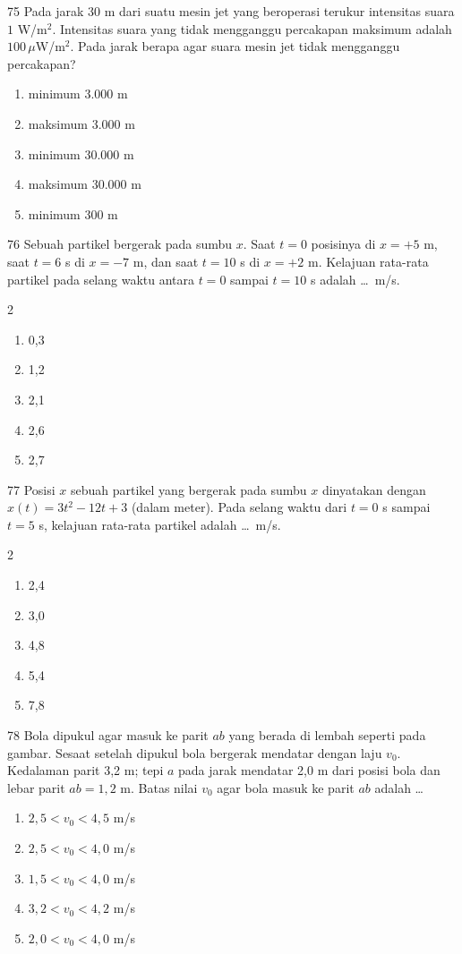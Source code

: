 \documentclass[11pt]{article}
\newenvironment{pil}{%
  \begin{enumerate}[label=(\Alph*),leftmargin=*,itemsep=1pt,topsep=3pt]}%
  {\end{enumerate}}
\newenvironment{pilB}{%
  \par\smallskip\begin{multicols}{2}
  \begin{enumerate}[label=(\Alph*),leftmargin=*,itemsep=1pt,topsep=3pt]}%
  {\end{enumerate}\end{multicols}}
\begin{document}
\begin{soal}{75}
Pada jarak 30 m dari suatu mesin jet yang beroperasi terukur intensitas
suara $1$ W/m$^2$. Intensitas suara yang tidak mengganggu percakapan
maksimum adalah $100\,\mu$W/m$^2$. Pada jarak berapa agar suara mesin
jet tidak mengganggu percakapan?
\begin{pil}
  \item minimum 3.000 m \item maksimum 3.000 m \item minimum 30.000 m
  \item maksimum 30.000 m \item minimum 300 m
\end{pil}
\end{soal}


\begin{soal}{76}
Sebuah partikel bergerak pada sumbu $x$. Saat $t=0$ posisinya di
$x=+5$ m, saat $t=6$ s di $x=-7$ m, dan saat $t=10$ s di $x=+2$ m.
Kelajuan rata-rata partikel pada selang waktu antara $t=0$ sampai
$t=10$ s adalah \ldots\ m/s.
\begin{pilB}
  \item 0,3 \item 1,2 \item 2,1 \item 2,6 \item 2,7
\end{pilB}
\end{soal}

\begin{soal}{77}
Posisi $x$ sebuah partikel yang bergerak pada sumbu $x$ dinyatakan
dengan $x(t)=3t^2-12t+3$ (dalam meter). Pada selang waktu dari $t=0$ s
sampai $t=5$ s, kelajuan rata-rata partikel adalah \ldots\ m/s.
\begin{pilB}
  \item 2,4 \item 3,0 \item 4,8 \item 5,4 \item 7,8
\end{pilB}
\end{soal}

\begin{soal}{78}
Bola dipukul agar masuk ke parit $ab$ yang berada di lembah seperti pada
gambar. Sesaat setelah dipukul bola bergerak mendatar dengan laju $v_0$.
Kedalaman parit 3,2 m; tepi $a$ pada jarak mendatar 2,0 m dari posisi
bola dan lebar parit $ab=1{,}2$ m. Batas nilai $v_0$ agar bola masuk
ke parit $ab$ adalah \ldots
\begin{pil}
  \item $2{,}5<v_0<4{,}5$ m/s \item $2{,}5<v_0<4{,}0$ m/s
  \item $1{,}5<v_0<4{,}0$ m/s \item $3{,}2<v_0<4{,}2$ m/s
  \item $2{,}0<v_0<4{,}0$ m/s
\end{pil}
\end{soal}
\end{document}
